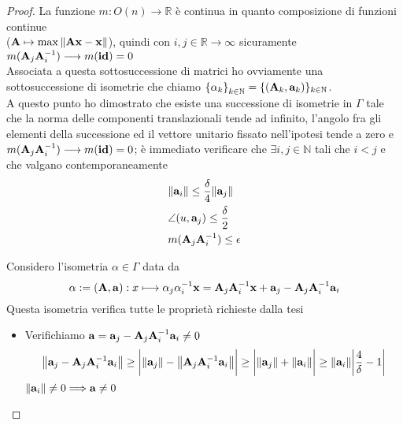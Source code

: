 \documentclass[a4paper,11pt,openright,twoside	]{book}
\begin{document}
\begin{proof}
\newpage
La funzione  $ m: O(n) \longrightarrow \mathbb{R}$  è continua in quanto composizione di funzioni continue \\ ($ \vb{A} \mapsto \max{\norm{\vb{Ax-x}}} $), quindi con $i,j \in \mathbb{R} \longrightarrow \infty $ sicuramente $m(\vb{A}_j \vb{A}^{-1}_i) \longrightarrow m(\vb{id}) = 0 $ \\
Associata a questa sottosuccessione di matrici ho ovviamente una sottosuccessione di isometrie che chiamo ${ \{\alpha_k \}}_{k \in \mathbb{N}} = \{ (\vb{A}_k , \vb{a}_k ) \}_{k \in \mathbb{N}}$. \\
A questo punto ho dimostrato che esiste una successione di isometrie in $\Gamma$ tale che la norma delle componenti translazionali tende ad infinito, l'angolo fra gli elementi della successione ed il vettore unitario fissato nell'ipotesi tende a zero e $m(\vb{A}_j \vb{A}^{-1}_i) \longrightarrow m(\vb{id}) = 0 $; è immediato verificare che $\exists i,j \in \mathbb{N} $  tali che  $ i < j$  e che valgano contemporaneamente
\begin{equation}
\label{eq:bib1}
\begin{split}
& \norm{\vb{a}_i} \leq \frac{\delta}{4}\norm{\vb{a}_j} \\
& \angle(u, \vb{a}_j ) \leq \frac{\delta}{2} \\
& m( \vb{A}_j \vb{A}^{-1}_i ) \leq \epsilon  
\end{split}
\end{equation}


Considero l'isometria $\alpha \in \Gamma$ data da 
\[ \alpha := (\vb{A, a})  : x \longmapsto \alpha_j \alpha^{-1}_i \vb{x} = \vb{A}_j \vb{A}^{-1}_i \vb{x} + \vb{a}_j - \vb{A}_j \vb{A}^{-1}_i \vb{a}_i\]
Questa isometria verifica tutte le proprietà richieste dalla tesi

\begin{itemize}
\item Verifichiamo  $\vb{a}= \vb{a}_j - \vb{A}_j \vb{A}^{-1}_i \vb{a}_i \neq 0$ 
\[ \norm{\vb{a}_j - \vb{A}_j \vb{A}^{-1}_i \vb{a}_i} \geq \bigg| \norm{\vb{a}_j} - \norm{ \vb{A}_j \vb{A}^{-1}_i \vb{a}_i } \bigg| \geq \bigg| \norm{\vb{a}_j } + \norm{\vb{a}_i} \bigg| \geq \norm{\vb{a}_i} \bigg| \frac{4}{\delta} -1 \bigg| \]
$\norm{\vb{a}_i} \neq 0 \Longrightarrow \vb{a} \neq 0$
 

\end{itemize}
\end{proof}
\end{document}
